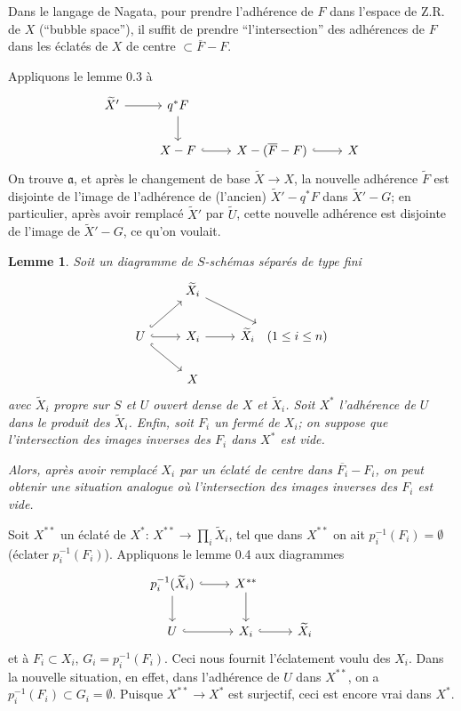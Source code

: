 \documentclass[11pt,a4paper]{article}
\theoremstyle{plain}
\newtheorem{lemma}[theorem]{Lemme}
\theoremstyle{definition}
\begin{document}
Dans le langage de Nagata, pour prendre l'adh\'erence de $F$ dans l'espace de Z.R. de $X$ (``bubble space''), il suffit de prendre ``l'intersection'' des adh\'erences de $F$ dans les \'eclat\'es de $X$ de centre $\subset \overline{F} - F$.

Appliquons le lemme 0.3 \`a
\[
\begin{tikzcd}
\widetilde{X}' \arrow[r] & q^*F \arrow[d] \\
& X - F \arrow[r, hook] & X - (\overline{F} - F) \arrow[r, hook] & X
\end{tikzcd}
\]
On trouve $\mathfrak{a}$, et apr\`es le changement de base $\widetilde{X} \to X$, la nouvelle adh\'erence $\widetilde{F}$ est disjointe de l'image de l'adh\'erence de (l'ancien) $\widetilde{X}' - q^*F$ dans $\widetilde{X}' - G$; en particulier, apr\`es avoir remplac\'e $\widetilde{X}'$ par $\widetilde{U}$, cette nouvelle adh\'erence est disjointe de l'image de $\widetilde{X}' - G$, ce qu'on voulait.

\begin{lemma}
Soit un diagramme de $S$-sch\'emas s\'epar\'es de type fini
\[
\begin{tikzcd}
& \widetilde{X}_i \arrow[dr] \\
U \arrow[ur, hook] \arrow[dr, hook] \arrow[r, hook] & X_i \arrow[r] & \widetilde{X}_i \quad (1 \leq i \leq n) \\
& X
\end{tikzcd}
\]
avec $\widetilde{X}_i$ propre sur $S$ et $U$ ouvert dense de $X$ et $\widetilde{X}_i$. Soit $X^*$ l'adh\'erence de $U$ dans le produit des $\widetilde{X}_i$. Enfin, soit $F_i$ un ferm\'e de $X_i$; on suppose que l'intersection des images inverses des $F_i$ dans $X^*$ est vide.

Alors, apr\`es avoir remplac\'e $X_i$ par un \'eclat\'e de centre dans $\overline{F_i} - F_i$, on peut obtenir une situation analogue o\`u l'intersection des images inverses des $F_i$ est vide.
\end{lemma}

Soit $X^{**}$ un \'eclat\'e de $X^*$: $X^{**} \to \prod_i \widetilde{X}_i$, tel que dans $X^{**}$ on ait $p_i^{-1}(F_i) = \emptyset$ (\'eclater $p_i^{-1}(F_i)$). Appliquons le lemme 0.4 aux diagrammes
\[
\begin{tikzcd}
p_i^{-1}(\widetilde{X}_i) \arrow[r, hook] \arrow[d] & X^{**} \arrow[d] \\
U \arrow[r, hook] & X_i \arrow[r, hook] & \widetilde{X}_i
\end{tikzcd}
\]
et \`a $F_i \subset X_i$, $G_i = p_i^{-1}(F_i)$. Ceci nous fournit l'\'eclatement voulu des $X_i$. Dans la nouvelle situation, en effet, dans l'adh\'erence de $U$ dans $X^{**}$, on a $p_i^{-1}(F_i) \subset G_i = \emptyset$. Puisque $X^{**} \to X^*$ est surjectif, ceci est encore vrai dans $X^*$.
\end{document}
